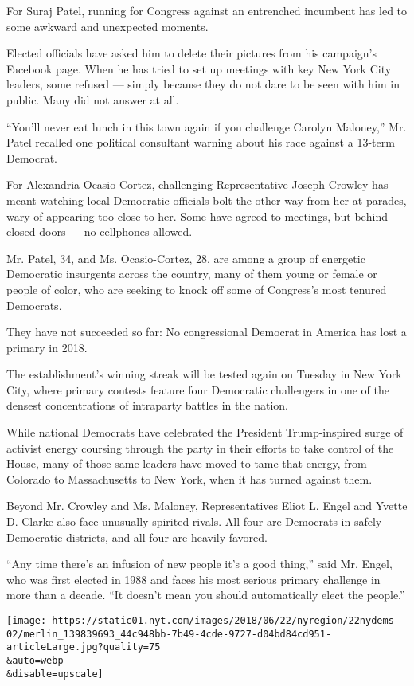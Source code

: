 For Suraj Patel, running for Congress against an entrenched incumbent
has led to some awkward and unexpected moments.

Elected officials have asked him to delete their pictures from his
campaign's Facebook page. When he has tried to set up meetings with key
New York City leaders, some refused --- simply because they do not dare
to be seen with him in public. Many did not answer at all.

``You'll never eat lunch in this town again if you challenge Carolyn
Maloney,'' Mr. Patel recalled one political consultant warning about his
race against a 13-term Democrat.

For Alexandria Ocasio-Cortez, challenging Representative Joseph Crowley
has meant watching local Democratic officials bolt the other way from
her at parades, wary of appearing too close to her. Some have agreed to
meetings, but behind closed doors --- no cellphones allowed.

Mr. Patel, 34, and Ms. Ocasio-Cortez, 28, are among a group of energetic
Democratic insurgents across the country, many of them young or female
or people of color, who are seeking to knock off some of Congress's most
tenured Democrats.

They have not succeeded so far: No congressional Democrat in America has
lost a primary in 2018.

The establishment's winning streak will be tested again on Tuesday in
New York City, where primary contests feature four Democratic
challengers in one of the densest concentrations of intraparty battles
in the nation.

While national Democrats have celebrated the President Trump-inspired
surge of activist energy coursing through the party in their efforts to
take control of the House, many of those same leaders have moved to tame
that energy, from Colorado to Massachusetts to New York, when it has
turned against them.

Beyond Mr. Crowley and Ms. Maloney, Representatives Eliot L. Engel and
Yvette D. Clarke also face unusually spirited rivals. All four are
Democrats in safely Democratic districts, and all four are heavily
favored.

``Any time there's an infusion of new people it's a good thing,'' said
Mr. Engel, who was first elected in 1988 and faces his most serious
primary challenge in more than a decade. ``It doesn't mean you should
automatically elect the people.''

\texttt{[image: https://static01.nyt.com/images/2018/06/22/nyregion/22nydems-02/merlin\_139839693\_44c948bb-7b49-4cde-9727-d04bd84cd951-articleLarge.jpg?quality=75\\\&auto=webp\\\&disable=upscale]}

